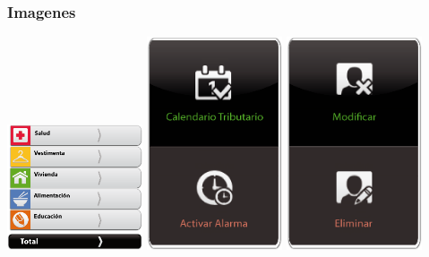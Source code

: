 \documentclass[utf8]{beamer}
\begin{document}
\begin{frame}[allowframbreaks]
\frametitle{Imagenes}
\begin{center}
\includegraphics[width=0.3\textwidth]{informe_gastos.png}
\includegraphics[width=0.3\textwidth]{alarma_over.png}
\includegraphics[width=0.3\textwidth]{micuentaelimi_over.png}
\end{center}
\end{frame}
\end{document}
